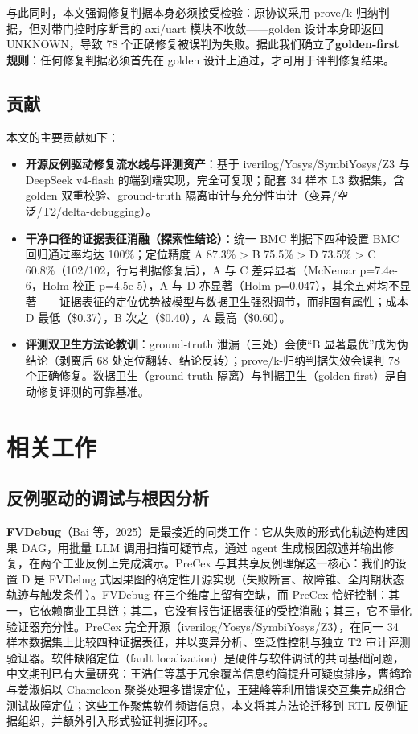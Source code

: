 \documentclass[journal]{IEEEtran}
\begin{document}
与此同时，本文强调修复判据本身必须接受检验：原协议采用 prove/k-归纳判据，但对带门控时序断言的 axi/uart 模块不收敛——golden 设计本身即返回 UNKNOWN，导致 78 个正确修复被误判为失败。据此我们确立了\textbf{golden-first 规则}：任何修复判据必须首先在 golden 设计上通过，才可用于评判修复结果。

\subsection{贡献}

本文的主要贡献如下：

\begin{itemize}
\item \textbf{开源反例驱动修复流水线与评测资产}：基于 iverilog/Yosys/SymbiYosys/Z3 与 DeepSeek v4-flash 的端到端实现，完全可复现；配套 34 样本 L3 数据集，含 golden 双重校验、ground-truth 隔离审计与充分性审计（变异/空泛/T2/delta-debugging）。
\item \textbf{干净口径的证据表征消融（探索性结论）}：统一 BMC 判据下四种设置 BMC 回归通过率均达 100\%；定位精度 A 87.3\% > B 75.5\% > D 73.5\% > C 60.8\%（102/102，行号判据修复后），A 与 C 差异显著（McNemar p=7.4e-6，Holm 校正 p=4.5e-5），A 与 D 亦显著（Holm p=0.047），其余五对均不显著——证据表征的定位优势被模型与数据卫生强烈调节，而非固有属性；成本 D 最低（\$0.37），B 次之（\$0.40），A 最高（\$0.60）。
\item \textbf{评测双卫生方法论教训}：ground-truth 泄漏（三处）会使“B 显著最优”成为伪结论（剥离后 68 处定位翻转、结论反转）；prove/k-归纳判据失效会误判 78 个正确修复。数据卫生（ground-truth 隔离）与判据卫生（golden-first）是自动修复评测的可靠基准。
\end{itemize}

\section{相关工作}

\subsection{反例驱动的调试与根因分析}

\textbf{FVDebug}（Bai 等，2025）\cite{fvdebug}是最接近的同类工作：它从失败的形式化轨迹构建因果 DAG，用批量 LLM 调用扫描可疑节点，通过 agent 生成根因叙述并输出修复，在两个工业反例上完成演示。PreCex 与其共享反例理解这一核心：我们的设置 D 是 FVDebug 式因果图的确定性开源实现（失败断言、故障锥、全周期状态轨迹与触发条件）。FVDebug 在三个维度上留有空缺，而 PreCex 恰好控制：其一，它依赖商业工具链；其二，它没有报告证据表征的受控消融；其三，它不量化验证器充分性。PreCex 完全开源（iverilog/Yosys/SymbiYosys/Z3），在同一 34 样本数据集上比较四种证据表征，并以变异分析、空泛性控制与独立 T2 审计评测验证器。软件缺陷定位（fault localization）是硬件与软件调试的共同基础问题，中文期刊已有大量研究：王浩仁等基于冗余覆盖信息约简提升可疑度排序\cite{zh1}，曹鹤玲与姜淑娟以 Chameleon 聚类处理多错误定位\cite{zh2}，王建峰等利用错误交互集完成组合测试故障定位\cite{zh3}；这些工作聚焦软件频谱信息，本文将其方法论迁移到 RTL 反例证据组织，并额外引入形式验证判据闭环。。
\end{document}
